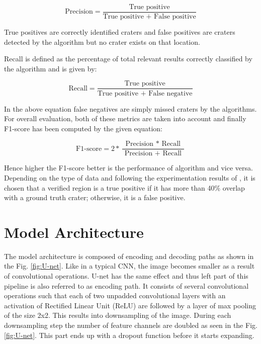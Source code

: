 \documentclass[11pt]{article}
\begin{document}
\begin{equation*}
\text{Precision} = \frac{\text{True positive}}{\text{True positive + False positive}}
\end{equation*}

True positives are correctly identified craters and false positives are craters detected by the algorithm but no crater exists on that location.

Recall is defined as the percentage of total relevant results correctly classified by the algorithm and is given by:

\begin{equation*}
\text{Recall} = \frac{\text{True positive}}{\text{True positive + False negative}}
\end{equation*}

In the above equation false negatives are simply missed craters by the algorithms. For overall evaluation, both of these metrics are taken into account and finally F1-score has been computed by the given equation:

\begin{equation*}
\text{F1-score} =2 * \frac{\text { Precision } * \text { Recall }}{\text { Precision }+\text { Recall }}
\end{equation*}

Hence higher the F1-score better is the performance of algorithm and vice versa. Depending on the type of data and following the experimentation results of \cite{emami2015automatic}, it is chosen that a verified region is a true positive if it has more than 40\% overlap with a ground truth crater; otherwise, it is a false positive.

\section{Model Architecture}
The model architecture is composed of encoding and decoding paths as shown in the Fig. \ref{fig:U-net}. Like in a typical CNN, the image becomes smaller as a result of convolutional operations. U-net has the same effect and thus left part of this pipeline is also referred to as encoding path. It consists of several convolutional operations such that each of two unpadded convolutional layers with an activation of Rectified Linear Unit (ReLU) are followed by a layer of max pooling of the size 2x2. This results into downsampling of the image. During each downsampling step the number of feature channels are doubled as seen in the Fig. \ref{fig:U-net}. This part ends up with a dropout function before it starts expanding.
\end{document}
